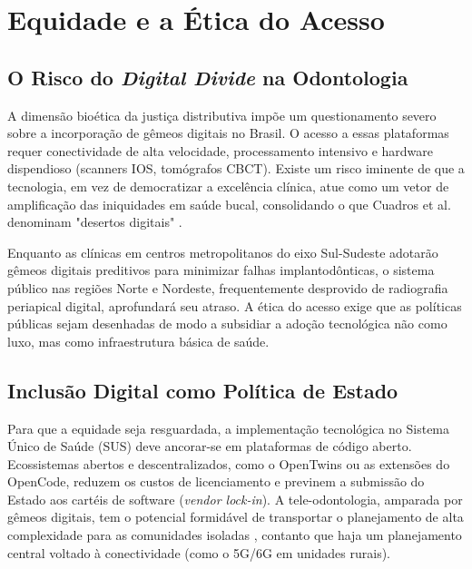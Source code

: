 \section{Equidade e a Ética do Acesso}
\label{sec:equidade}

\subsection{O Risco do \textit{Digital Divide} na Odontologia}

A dimensão bioética da justiça distributiva impõe um questionamento severo sobre a incorporação de gêmeos digitais no Brasil. O acesso a essas plataformas requer conectividade de alta velocidade, processamento intensivo e hardware dispendioso (scanners IOS, tomógrafos CBCT). Existe um risco iminente de que a tecnologia, em vez de democratizar a excelência clínica, atue como um vetor de amplificação das iniquidades em saúde bucal, consolidando o que Cuadros et al. denominam "desertos digitais" \cite{cuadros2023assessing}.

Enquanto as clínicas em centros metropolitanos do eixo Sul-Sudeste adotarão gêmeos digitais preditivos para minimizar falhas implantodônticas, o sistema público nas regiões Norte e Nordeste, frequentemente desprovido de radiografia periapical digital, aprofundará seu atraso. A ética do acesso exige que as políticas públicas sejam desenhadas de modo a subsidiar a adoção tecnológica não como luxo, mas como infraestrutura básica de saúde.

\subsection{Inclusão Digital como Política de Estado}

Para que a equidade seja resguardada, a implementação tecnológica no Sistema Único de Saúde (SUS) deve ancorar-se em plataformas de código aberto. Ecossistemas abertos e descentralizados, como o OpenTwins \cite{robles2023opentwins} ou as extensões do OpenCode, reduzem os custos de licenciamento e previnem a submissão do Estado aos cartéis de software (\textit{vendor lock-in}). A tele-odontologia, amparada por gêmeos digitais, tem o potencial formidável de transportar o planejamento de alta complexidade para as comunidades isoladas \cite{frota2025sus}, contanto que haja um planejamento central voltado à conectividade (como o 5G/6G em unidades rurais).
